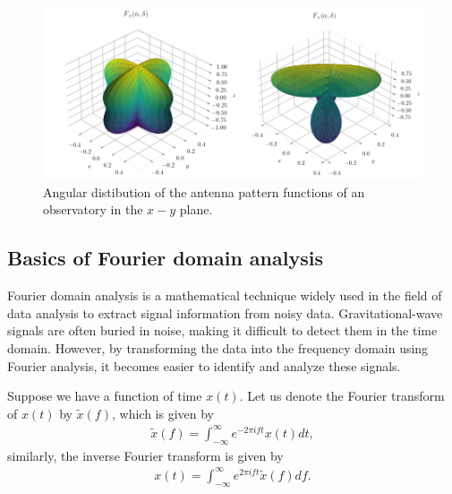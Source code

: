 \begin{figure}
    \centering
    \includegraphics[width=\textwidth]{figures/basic_data_analysis/antenna-pattern.png}
    \caption{Angular distibution of the antenna pattern functions of an observatory in the $x-y$ plane.}
    \label{fig:antenna-pattern}
\end{figure}


\subsection{Basics of Fourier domain analysis}

Fourier domain analysis is a mathematical technique widely used in the field of data analysis to extract signal information from noisy data. Gravitational-wave signals are often buried in noise, making it difficult to detect them in the time domain. However, by transforming the data into the frequency domain using Fourier analysis, it becomes easier to identify and analyze these signals.


Suppose we have a function of time $x(t)$. Let us denote the Fourier transform of $x(t)$ by $\tilde{x}(f)$, which is given by
    \begin{align}
        \tilde{x}(f) = \int_{-\infty}^{\infty} e^{-2\pi i ft} x(t) dt,
    \end{align}
    similarly, the inverse Fourier transform is given by
    \begin{align}
        x(t) = \int_{-\infty}^{\infty} e^{2\pi i f t} \tilde{x}(f) df.
    \end{align}

